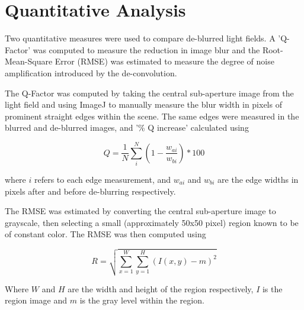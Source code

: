 \section{Quantitative Analysis}
\label{sec:quantitative_analysis}

Two quantitative measures were used to compare de-blurred light fields.
A 'Q-Factor' was computed to measure the reduction in image blur and the Root-Mean-Square Error (RMSE) was estimated to measure the degree of noise amplification introduced by the de-convolution.

The Q-Factor was computed by taking the central sub-aperture image from the light field and using ImageJ to manually measure the blur width in pixels of prominent straight edges within the scene.
The same edges were measured in the blurred and de-blurred images, and '\% Q increase' calculated using

\begin{equation}
Q = \frac{1}{N} \sum_{i}^{N}(1 - \frac{w_{ai}}{w_{bi}}) * 100
\end{equation}

where $i$ refers to each edge measurement, and $w_{ai}$ and $w_{bi}$ are the edge widths in pixels after and before de-blurring respectively.

The RMSE was estimated by converting the central sub-aperture image to grayscale, then selecting a small (approximately 50x50 pixel) region known to be of constant color.
The RMSE was then computed using

\begin{equation}
R = \sqrt{ \sum_{x=1}^{W} \sum_{y=1}^{H} (I(x,y) - m)^2 }
\end{equation}

Where $W$ and $H$ are the width and height of the region respectively, $I$ is the region image and $m$ is the gray level within the region.

